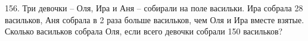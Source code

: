 156. Три девочки – Оля, Ира и Аня – собирали на поле васильки. Ира собрала 28 васильков, Аня собрала в 2 раза больше васильков, чем Оля и Ира вместе взятые. Сколько васильков собрала Оля, если всего девочки собрали 150 васильков?\\
